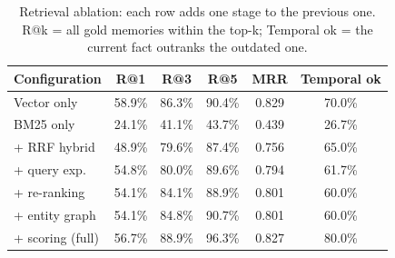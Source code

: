 \begin{table}[htbp]\centering\small
\begin{tabular}{lccccc}\hline
\textbf{Configuration} & \textbf{R@1} & \textbf{R@3} & \textbf{R@5} & \textbf{MRR} & \textbf{Temporal ok}\\\hline
Vector only & 58.9\% & 86.3\% & 90.4\% & 0.829 & 70.0\%\\
BM25 only & 24.1\% & 41.1\% & 43.7\% & 0.439 & 26.7\%\\
+ RRF hybrid & 48.9\% & 79.6\% & 87.4\% & 0.756 & 65.0\%\\
+ query exp. & 54.8\% & 80.0\% & 89.6\% & 0.794 & 61.7\%\\
+ re-ranking & 54.1\% & 84.1\% & 88.9\% & 0.801 & 60.0\%\\
+ entity graph & 54.1\% & 84.8\% & 90.7\% & 0.801 & 60.0\%\\
+ scoring (full) & 56.7\% & 88.9\% & 96.3\% & 0.827 & 80.0\%\\
\hline\end{tabular}
\caption{Retrieval ablation: each row adds one stage to the previous one. R@k = all gold memories within the top-k; Temporal ok = the current fact outranks the outdated one.}\label{tab:ablation}\end{table}
